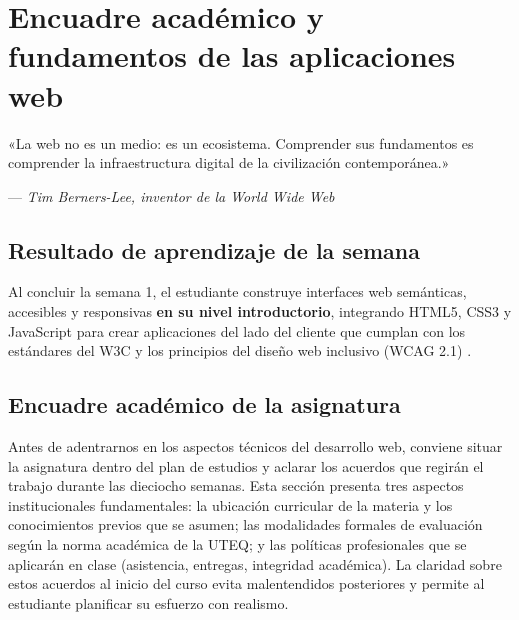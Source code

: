 \documentclass[11pt,a4paper,openany]{book}
\begin{document}
\tableofcontents
\newpage


\chapter{Encuadre académico y fundamentos de las aplicaciones web}
\label{cap:semana1}

\epigraph{«La web no es un medio: es un ecosistema. Comprender sus
fundamentos es comprender la infraestructura digital de la civilización
contemporánea.»}{--- \textit{Tim Berners-Lee, inventor de la World Wide Web}}

\section*{Resultado de aprendizaje de la semana}
Al concluir la semana 1, el estudiante construye interfaces web
semánticas, accesibles y responsivas \textbf{en su nivel introductorio},
integrando HTML5, CSS3 y JavaScript para crear aplicaciones del lado
del cliente que cumplan con los estándares del W3C y los principios del
diseño web inclusivo (WCAG 2.1) \cite{w3c2018wcag}.

\section{Encuadre académico de la asignatura}

Antes de adentrarnos en los aspectos técnicos del desarrollo web,
conviene situar la asignatura dentro del plan de estudios y aclarar
los acuerdos que regirán el trabajo durante las dieciocho semanas.
Esta sección presenta tres aspectos institucionales fundamentales: la
ubicación curricular de la materia y los conocimientos previos que se
asumen; las modalidades formales de evaluación según la norma
académica de la UTEQ; y las políticas profesionales que se aplicarán
en clase (asistencia, entregas, integridad académica). La claridad
sobre estos acuerdos al inicio del curso evita malentendidos
posteriores y permite al estudiante planificar su esfuerzo con
realismo.
\end{document}
